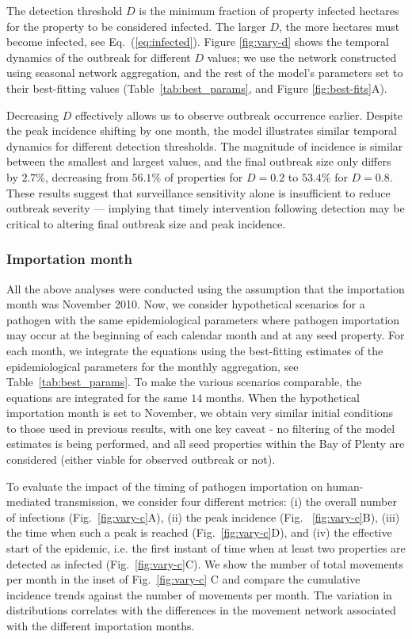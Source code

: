 \documentclass[aps,physrev,reprint,superscriptaddress]{revtex4-1}
\begin{document}

The detection threshold $D$ is the minimum fraction of property infected hectares for the property to be considered infected. The larger $D$, the more hectares must become infected, see Eq.~(\ref{eq:infected}). Figure \ref{fig:vary-d} shows the temporal dynamics of the outbreak for different $D$ values; we use the network constructed using seasonal network aggregation, and the rest of the model's parameters set to their best-fitting values (Table~\ref{tab:best_params}, and Figure \ref{fig:best-fits}A). 

Decreasing $D$ effectively allows us to observe outbreak occurrence earlier. Despite the peak incidence shifting by one month, the model illustrates similar temporal dynamics for different detection thresholds. The magnitude of incidence is similar between the smallest and largest values, and the final outbreak size only differs by $2.7\%$, decreasing from $56.1\%$ of properties for $D = 0.2$ to $53.4\%$ for $D = 0.8$. These results suggest that surveillance sensitivity alone is insufficient to reduce outbreak severity — implying that timely intervention following detection may be critical to altering final outbreak size and peak incidence. 


\subsubsection{Importation month}


All the above analyses were conducted using the assumption that the importation month was November 2010. Now, we consider hypothetical scenarios for a pathogen with the same epidemiological parameters where pathogen importation may occur at the beginning of each calendar month and at any seed property. For each month, we integrate the equations using the best-fitting estimates of the epidemiological parameters for the monthly aggregation, see Table~\ref{tab:best_params}. To make the various scenarios comparable, the equations are integrated for the same $14$ months. When the hypothetical importation month is set to November, we obtain very similar initial conditions to those used in previous results, with one key caveat - no filtering of the model estimates is being performed, and all seed properties within the Bay of Plenty are considered (either viable for observed outbreak or not).

To evaluate the impact of the timing of pathogen importation on human-mediated transmission, we consider four different metrics: (i) the overall number of infections (Fig.~\ref{fig:vary-c}A), (ii) the peak incidence (Fig. ~\ref{fig:vary-c}B), (iii) the time when such a peak is reached (Fig.~\ref{fig:vary-c}D), and (iv) the effective start of the epidemic, i.e. the first instant of time when at least two properties are detected as infected (Fig.~\ref{fig:vary-c}C). We show the number of total movements per month in the inset of Fig.~\ref{fig:vary-c} C and compare the cumulative incidence trends against the number of movements per month. The variation in distributions correlates with the differences in the movement network associated with the different importation months.   
\end{document}
